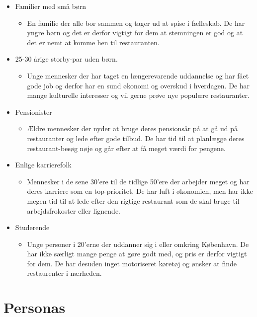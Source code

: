\documentclass[a4paper, 12pt]{article}
\begin{document}
\begin{itemize}
  \item Familier med små børn
  \begin{itemize}
    \item En familie der alle bor sammen og tager ud at spise i fælleskab. De har yngre børn og det er derfor vigtigt for dem at stemningen er god og at det er nemt at komme hen til restauranten.
  \end{itemize}
  \item 25-30 årige storby-par uden børn.
  \begin{itemize}
    \item Unge mennesker der har taget en længerevarende uddannelse og har fået gode job og derfor har en sund økonomi og overskud i hverdagen. De har mange kulturelle interesser og vil gerne prøve nye populære restauranter.
  \end{itemize}
  \item Pensionister
 \begin{itemize}
    \item Ældre mennesker der nyder at bruge deres pensionsår på at gå ud på restauranter og lede efter gode tilbud. De har tid til at planlægge deres restaurant-besøg nøje og går efter at få meget værdi for pengene.
  \end{itemize}
  \item Enlige karrierefolk
 \begin{itemize}
    \item Mennesker i de sene 30'ere til de tidlige 50'ere der arbejder meget og har deres karriere som en top-prioritet. De har luft i økonomien, men har ikke megen tid til at lede efter den rigtige restaurant som de skal bruge til arbejdsfrokoster eller lignende.
  \end{itemize}
  \item Studerende
 \begin{itemize}
    \item Unge personer i 20'erne der uddanner sig i eller omkring København. De har ikke særligt mange penge at gøre godt med, og pris er derfor vigtigt for dem. De har desuden inget motoriseret køretøj og ønsker at finde restaurenter i nærheden.
  \end{itemize}
\end{itemize}

\section{Personas}
\label{sec:Personas}
\end{document}
